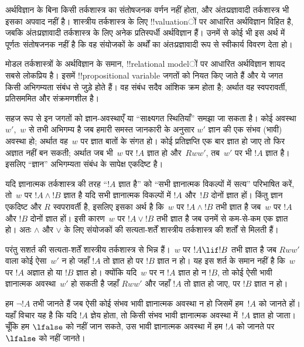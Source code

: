 \documentclass[../../../include/open-logic-section]{subfiles}
\begin{document}


अर्थविज्ञान के बिना किसी तर्कशास्त्र का संतोषजनक वर्णन नहीं होता, और
अंतःप्रज्ञावादी तर्कशास्त्र भी इसका अपवाद नहीं है। शास्त्रीय तर्कशास्त्र के
लिए !!{valuation}ों पर आधारित अर्थविज्ञान विहित है, जबकि अंतःप्रज्ञावादी
तर्कशास्त्र के लिए अनेक प्रतिस्पर्धी अर्थविज्ञान हैं। उनमें से कोई भी इस अर्थ
में पूर्णतः संतोषजनक नहीं है कि वह संयोजकों के अर्थों का अंतःप्रज्ञावादी रूप
से स्वीकार्य विवरण देता हो।

मोडल तर्कशास्त्रों के अर्थविज्ञान के समान, !!{relational model}ों पर
आधारित अर्थविज्ञान शायद सबसे लोकप्रिय है। इसमें !!{propositional variable} जगतों
को नियत किए जाते हैं और ये जगत किसी अभिगम्यता संबंध से जुड़े होते हैं। वह
संबंध सदैव आंशिक क्रम होता है; अर्थात वह स्वपरावर्ती, प्रतिसममित और
संक्रमणशील है।

सहज रूप से इन जगतों को ज्ञान-अवस्थाएँ या ``साक्ष्यगत स्थितियाँ'' समझा जा
सकता है। कोई अवस्था~$w'$,~$w$ से तभी अभिगम्य है जब हमारी समस्त जानकारी के
अनुसार $w'$ ज्ञान की एक संभव (भावी) अवस्था हो; अर्थात वह~$w$ पर ज्ञात बातों
के संगत हो। कोई प्रतिज्ञप्ति एक बार ज्ञात हो जाए तो फिर अज्ञात नहीं बन सकती;
अर्थात जब भी~$w$ पर $!A$ ज्ञात हो और~$Rww'$, तब~$w'$ पर भी $!A$ ज्ञात है।
इसलिए ``ज्ञान'' अभिगम्यता संबंध के सापेक्ष एकदिष्ट है।

यदि ज्ञानात्मक तर्कशास्त्र की तरह ``$!A$ ज्ञात है'' को ``सभी ज्ञानात्मक
विकल्पों में सत्य'' परिभाषित करें, तो~$w$ पर $!A \land !B$ ज्ञात है यदि सभी
ज्ञानात्मक विकल्पों में $!A$ और~$!B$ दोनों ज्ञात हों। किंतु ज्ञान एकदिष्ट
और $R$ स्वपरावर्ती है, इसलिए इसका अर्थ है कि~$w$ पर $!A \land !B$ तभी ज्ञात
है जब~$w$ पर $!A$ और $!B$ दोनों ज्ञात हों। इसी कारण~$w$ पर $!A \lor !B$
तभी ज्ञात है जब उनमें से कम-से-कम एक ज्ञात हो। अतः $\land$ और $\lor$ के
लिए संयोजकों की सत्यता-शर्तें शास्त्रीय तर्कशास्त्र की शर्तों से मिलती हैं।

परंतु सशर्त की सत्यता-शर्तें शास्त्रीय तर्कशास्त्र से भिन्न हैं।~$w$ पर
$!A \lif !B$ तभी ज्ञात है जब $Rww'$ वाला कोई ऐसा~$w'$ न हो जहाँ $!A$ तो
ज्ञात हो पर $!B$ ज्ञात न हो। यह इस शर्त के समान नहीं है कि~$w$ पर $!A$
अज्ञात हो या $!B$ ज्ञात हो। क्योंकि यदि~$w$ पर न $!A$ ज्ञात हो न $!B$, तो
कोई ऐसी भावी ज्ञानात्मक अवस्था~$w'$ हो सकती है जहाँ $Rww'$ और जहाँ $!A$
तो ज्ञात हो जाए, पर $!B$ ज्ञात न हो।

हम $\lnot !A$ तभी जानते हैं जब ऐसी कोई संभव भावी ज्ञानात्मक अवस्था न हो
जिसमें हम~$!A$ को जानते हों। यहाँ विचार यह है कि यदि $!A$ ज्ञेय होता, तो
किसी संभव भावी ज्ञानात्मक अवस्था में~$!A$ ज्ञात हो जाता। चूँकि हम $\lfalse$
को नहीं जान सकते, उस भावी ज्ञानात्मक अवस्था में हम $!A$ को जानते पर
~$\lfalse$ को नहीं जानते।
\end{document}
